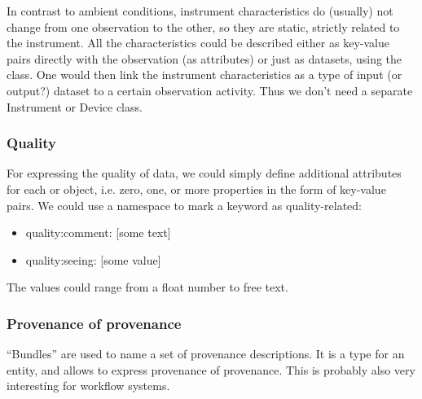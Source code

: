 In contrast to ambient conditions, instrument characteristics do (usually) not
change from one observation to the other, so they are static, strictly related to
the instrument. 
All the characteristics could be described either as key-value pairs directly with the 
observation (as attributes) or just as datasets, using the  class. 
One would then 
link the instrument characteristics as a type of input (or output?) dataset to a certain 
observation activity. Thus we don't need a separate Instrument or Device class.



\subsubsection{Quality}
For expressing the quality of data, we could simply define additional 
attributes for each 
or  object, i.e. zero, one, or more properties in the form of
key-value pairs. We could use a  namespace to mark a keyword
as quality-related:
\begin{itemize}
    \item quality:comment: [some text]
    \item quality:seeing: [some value]
\end{itemize}
The values could range from a float number to free text.


\subsubsection{Provenance of provenance}
``Bundles'' are used to name a set of provenance descriptions. It is a type for 
an entity, and allows to express provenance of provenance. This is probably also 
very interestíng for workflow systems.

